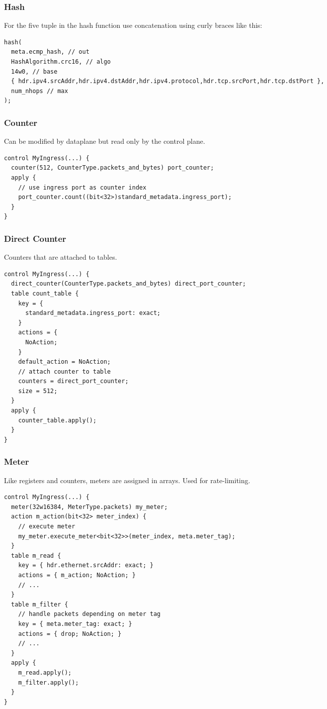 \documentclass[a4paper, fontsize=8pt, landscape, DIV=1]{scrartcl}
\begin{document}
\begin{multicols*}{3}
  \subsubsection{Hash}
  For the five tuple in the hash function use concatenation using curly braces like this:
  \begin{lstlisting}[style=P4style]
hash(
  meta.ecmp_hash, // out
  HashAlgorithm.crc16, // algo
  14w0, // base
  { hdr.ipv4.srcAddr,hdr.ipv4.dstAddr,hdr.ipv4.protocol,hdr.tcp.srcPort,hdr.tcp.dstPort },
  num_nhops // max
);\end{lstlisting}

  \subsubsection{Counter}
  Can be modified by dataplane but read only by the control plane.
  \begin{lstlisting}[style=P4style]
control MyIngress(...) {
  counter(512, CounterType.packets_and_bytes) port_counter;
  apply {
    // use ingress port as counter index
    port_counter.count((bit<32>)standard_metadata.ingress_port);
  }
}\end{lstlisting}

  \subsubsection{Direct Counter}
  Counters that are attached to tables.
  \begin{lstlisting}[style=P4style]
control MyIngress(...) {
  direct_counter(CounterType.packets_and_bytes) direct_port_counter;
  table count_table {
    key = {
      standard_metadata.ingress_port: exact;
    }
    actions = {
      NoAction;
    }
    default_action = NoAction;
    // attach counter to table
    counters = direct_port_counter;
    size = 512;
  }
  apply {
    counter_table.apply();
  }
}\end{lstlisting}


  \subsubsection{Meter}
  Like registers and counters, meters are assigned in arrays. Used for rate-limiting.
  \begin{lstlisting}[style=P4style]
control MyIngress(...) {
  meter(32w16384, MeterType.packets) my_meter;
  action m_action(bit<32> meter_index) {
    // execute meter
    my_meter.execute_meter<bit<32>>(meter_index, meta.meter_tag);
  }
  table m_read {
    key = { hdr.ethernet.srcAddr: exact; }
    actions = { m_action; NoAction; }
    // ...
  }
  table m_filter {
    // handle packets depending on meter tag
    key = { meta.meter_tag: exact; }
    actions = { drop; NoAction; }
    // ...
  }
  apply {
    m_read.apply();
    m_filter.apply();
  }
} \end{lstlisting}



\end{multicols*}
\end{document}
